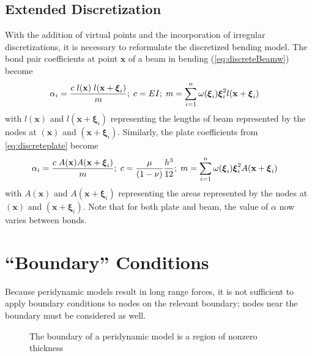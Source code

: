 \subsection{Extended Discretization}
With the addition of virtual points and the incorporation of irregular discretizations, it is necessary to reformulate the discretized bending model.
The bond pair coefficients at point $\mathbf{x}$ of a beam in bending (\cref{eq:discreteBeamw}) become
%
\begin{align}
\label{eq:discreteBeamw2}
\alpha_i &= \frac{c\; l(\mathbf{x})\;l(\mathbf{x}+\boldsymbol{\xi}_i)}{m} ;\; c= EI ;\; m=\sum_{i=1}^n \omega(\boldsymbol{\xi}_i)\boldsymbol{\xi}_i^2 l(\mathbf{x}+\boldsymbol{\xi}_i) \notag
\end{align}
with $l(\mathbf{x})$ and $l(\mathbf{x}+\boldsymbol{\xi}_i)$ representing the lengths of beam represented by the nodes at  $(\mathbf{x})$ and $(\mathbf{x}+\boldsymbol{\xi}_i)$.
Similarly, the plate coefficients from \cref{eq:discreteplate} become
%
\begin{align}
    \alpha_i &= \frac{c\; A(\mathbf{x})A(\mathbf{x}+\boldsymbol{\xi}_i)}{m} ;\; c= \frac{\mu}{(1-\nu)}\frac{h^3}{12};\; m=\sum_{i=1}^n \omega(\boldsymbol{\xi}_i)\boldsymbol{\xi}_i^2A(\mathbf{x}+\boldsymbol{\xi}_i) \notag
\end{align}
%
with $A(\mathbf{x})$ and $A(\mathbf{x}+\boldsymbol{\xi}_i)$ representing the areas represented by the nodes at  $(\mathbf{x})$ and $(\mathbf{x}+\boldsymbol{\xi}_i)$.
Note that for both plate and beam, the value of $\alpha$ now varies between bonds.
\section{``Boundary'' Conditions}
Because peridynamic models result in long range forces, it is not sufficient to apply boundary conditions to nodes on the relevant boundary; nodes near the boundary must be considered as well.
%
\begin{figure}[htbp]
  \vspace{5mm}
  \centering
  
  \caption{The boundary of a peridynamic model is a region of nonzero thickness}
  \label{fig:PDboundary}
\end{figure}
%


